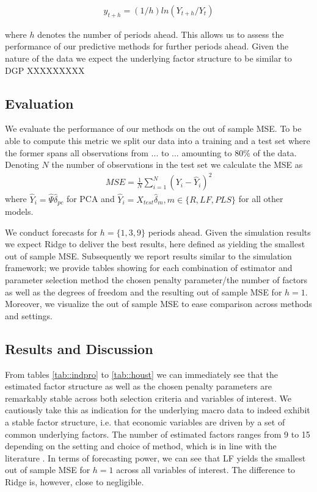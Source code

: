 \begin{align*}
	y_{t+h} = (1/h) ln(Y_{t+h}/Y_t)
\end{align*}

where $h$ denotes the number of periods ahead. This allows us to assess the performance of our predictive methods for further periods ahead.
Given the nature of the data we expect the underlying factor structure to be similar to DGP XXXXXXXXX 

\subsection{Evaluation}
We evaluate the performance of our methods on the out of sample MSE. To be able to compute this metric we split our data into a training and a test set where the former spans all observations from ... to ... amounting to 80\% of the data. Denoting $N$ the number of observations in the test set we calculate the MSE as
\begin{align*}
	    MSE = \frac{1}{N} \sum_{i=1}^N (Y_i - \widehat{Y}_i)^2
\end{align*}
where $\widehat{Y}_i = \widehat{\Psi} \widehat{\delta}_{pc}$ for PCA and $\widehat{Y}_i = X_{test} \widehat{\delta}_{m}, m \in \{R, LF, PLS\}$ for all other models. 

We conduct forecasts for $h = \{1, 3, 9\}$ periods ahead. Given the simulation results we expect Ridge to deliver the best results, here defined as yielding the smallest out of sample MSE. Subsequently we report results similar to the simulation framework; we provide tables showing for each combination of estimator and parameter selection method the chosen penalty parameter/the number of factors as well as the degrees of freedom and the resulting out of sample MSE for $h=1$. Moreover, we visualize the out of sample MSE to ease comparison across methods and settings.

\subsection{Results and Discussion}
From tables \ref{tab::indpro} to \ref{tab::houst} we can immediately see that the estimated factor structure as well as the chosen penalty parameters are remarkably stable across both selection criteria and variables of interest. We cautiously take this as indication for the underlying macro data to indeed exhibit a stable factor structure, i.e. that economic variables are driven by a set of common underlying factors. \cite{} The number of estimated factors ranges from 9 to 15 depending on the setting and choice of method, which is in line with the literature \cite{}.
In terms of forecasting power, we can see that LF yields the smallest out of sample MSE for $h=1$ across all variables of interest. The difference to Ridge is, however, close to negligible. 


